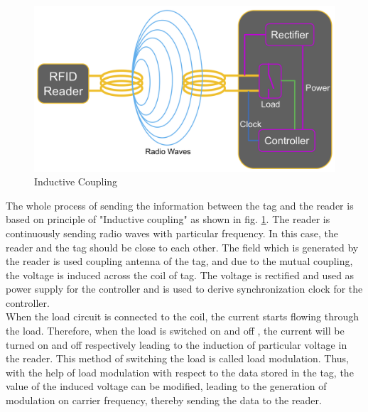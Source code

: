 \begin{figure}[!htbp]
	\centering
	\includegraphics[width = 13cm]{Pictures/rfidtotag}
	\caption{Inductive Coupling}
	\label{rfid_to_tag}
\end{figure}
The whole process of sending the information between the tag and the reader is based on principle of "Inductive coupling" as shown in fig. \ref{rfid_to_tag}.
The reader is continuously sending radio waves with particular frequency. In this case, the reader and the tag should be close to each other. The field which is generated by the reader is used coupling antenna of the tag, and due to the mutual coupling, the voltage is induced across the coil of tag. The voltage is rectified and used as power supply for the controller and is used to derive synchronization clock for the controller.\\
When the load circuit is connected to the coil, the current starts flowing through the load. Therefore, when the load is switched on and off , the current will be turned on and off respectively leading to the induction of particular voltage in the reader. This method of switching the load is called load modulation. Thus, with the help of load modulation with respect to the data stored in the tag, the value of the induced voltage can be modified, leading to the generation of modulation on carrier frequency, thereby sending the data to the reader.\\
